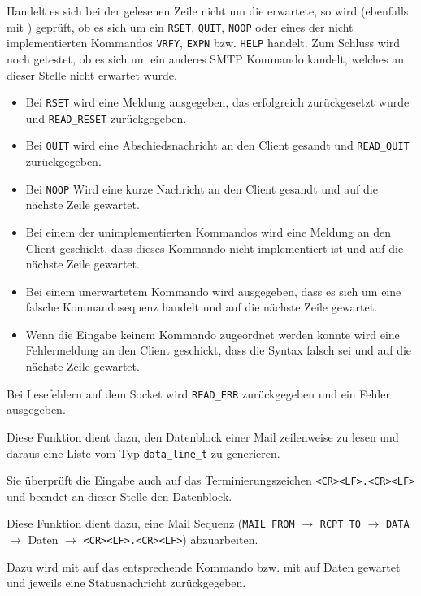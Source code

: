 Handelt es sich bei der gelesenen Zeile nicht um die erwartete, so wird (ebenfalls mit ) gepr\"{u}ft, ob es sich um ein \texttt{RSET}, \texttt{QUIT}, \texttt{NOOP} oder eines der nicht implementierten Kommandos \texttt{VRFY}, \texttt{EXPN} bzw. \texttt{HELP} handelt. Zum Schluss wird noch getestet, ob es sich um ein anderes SMTP Kommando kandelt, welches an dieser Stelle nicht erwartet wurde.
\begin{itemize}
  \item Bei \texttt{RSET} wird eine Meldung ausgegeben, das erfolgreich zur\"{u}ckgesetzt wurde und \texttt{READ\_RESET} zur\"{u}ckgegeben. 
  \item Bei \texttt{QUIT} wird eine Abschiedsnachricht an den Client gesandt und \texttt{READ\_QUIT} zur\"{u}ckgegeben. 
  \item Bei \texttt{NOOP} Wird eine kurze Nachricht an den Client gesandt und auf die n\"{a}chste Zeile gewartet.
  \item Bei einem der unimplementierten Kommandos wird eine Meldung an den Client geschickt, dass dieses Kommando nicht implementiert ist und auf die n\"{a}chste Zeile gewartet.
  \item Bei einem unerwartetem Kommando wird ausgegeben, dass es sich um eine  falsche Kommandosequenz handelt und auf die n\"{a}chste Zeile gewartet.
  \item Wenn die Eingabe keinem Kommando zugeordnet werden konnte wird eine Fehlermeldung an den Client geschickt, dass die Syntax falsch sei und auf die n\"{a}chste Zeile gewartet. 
\end{itemize}

Bei Lesefehlern auf dem Socket wird \texttt{READ\_ERR} zur\"{u}ckgegeben und ein Fehler ausgegeben.

\label{fn:read_data}
Diese Funktion dient dazu, den Datenblock einer Mail zeilenweise zu lesen und daraus eine Liste vom Typ \texttt{data\_line\_t} zu generieren.

Sie \"{u}berpr\"{u}ft die Eingabe auch auf das Terminierungszeichen \texttt{<CR><LF>.<CR><LF>} und beendet an dieser Stelle den Datenblock.


\label{fn:session_sequence}
Diese Funktion dient dazu, eine Mail Sequenz (\texttt{MAIL FROM} $\rightarrow$ \texttt{RCPT TO} $\rightarrow$ \texttt{DATA} $\rightarrow$ Daten $\rightarrow$ \texttt{<CR><LF>.<CR><LF>}) abzuarbeiten.

Dazu wird mit  auf das entsprechende Kommando bzw. mit  auf Daten gewartet und jeweils eine Statusnachricht zur\"{u}ckgegeben.

